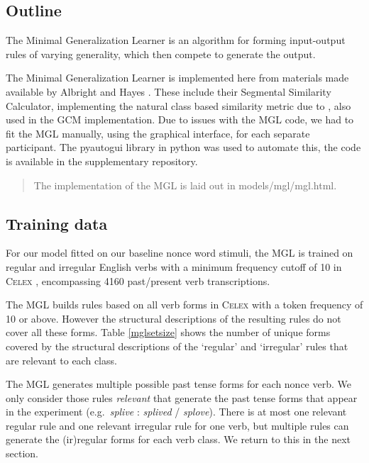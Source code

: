 \documentclass[12pt]{article}
\begin{document}
\subsection{Outline}

The Minimal Generalization Learner is an algorithm for forming input-output rules of varying generality, which then compete to generate the output. 

The Minimal Generalization Learner is implemented here from materials made available by Albright and Hayes \citep{albright2003rules}. These include their Segmental Similarity Calculator, implementing the natural class based similarity metric due to \cite{frisch1997similarity}, also used in the GCM implementation. Due to issues with the MGL code, we had to fit the MGL manually, using the graphical interface, for each separate participant. The pyautogui library in python was used to automate this, the code is available in the supplementary repository.

\begin{quote}
The implementation of the MGL is laid out in models/mgl/mgl.html.
\end{quote}

\subsection{Training data}

For our model fitted on our baseline nonce word stimuli, the MGL is trained on regular and irregular English verbs with a minimum frequency cutoff of 10 in \textsc{Celex} \citep{baayen1993celex}, encompassing 4160 past/present verb transcriptions. 

The MGL builds rules based on all verb forms in \textsc{Celex} with a token frequency of 10 or above. However the structural descriptions of the resulting rules do not cover all these forms. Table \ref{mglsetsize} shows the number of unique forms covered by the structural descriptions of the `regular' and `irregular' rules that are relevant to each class. 

The MGL generates multiple possible past tense forms for each nonce verb. We only consider those rules {\em relevant} that generate the past tense forms that appear in the experiment (e.g.\ {\em splive} : {\em splived} / {\em splove}). There is at most one relevant regular rule and one relevant irregular rule for one verb, but multiple rules can generate the (ir)regular forms for each verb class. We return to this in the next section.
\end{document}
